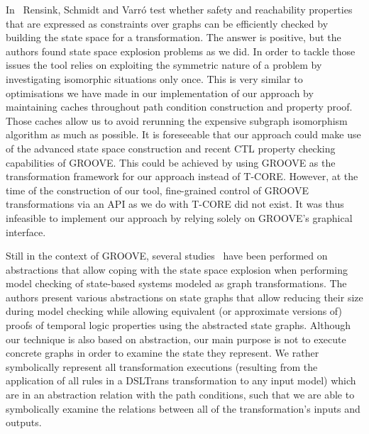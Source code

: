 In~\cite{DBLP:conf/gg/RensinkSV04} Rensink, Schmidt and Varr\'o test whether safety and reachability properties that are expressed as constraints over graphs can be efficiently checked by building the state space for a transformation. The answer is positive, but the authors found state space explosion problems as we did. In order to tackle those issues the tool relies on exploiting the symmetric nature of a problem by investigating isomorphic situations only once. This is very similar to optimisations we have made in our implementation of our approach by maintaining caches throughout path condition construction and property proof. Those caches allow us to avoid rerunning the expensive subgraph isomorphism algorithm as much as possible. It is foreseeable that our approach could make use of the advanced state space construction and recent CTL property checking capabilities of GROOVE. This could be achieved by using GROOVE as the transformation framework for our approach instead of T-CORE. However, at the time of the construction of our tool, fine-grained control of GROOVE transformations via an API as we do with T-CORE did not exist. It was thus infeasible to implement our approach by relying solely on GROOVE's graphical interface.

Still in the context of GROOVE, several studies~\cite{RensinkD06,BauerBKR08,RensinkZ12} have been performed on abstractions that allow coping with the state space explosion when performing model checking of state-based systems modeled as graph transformations. The authors present various abstractions on state graphs that allow reducing their size during model checking while allowing equivalent (or approximate versions of) proofs of temporal logic properties using the abstracted state graphs. Although our technique is also based on abstraction, our main purpose is not to execute concrete graphs in order to examine the state they represent. We rather symbolically represent all transformation executions (resulting from the application of all rules in a DSLTrans transformation to any input model) which are in an abstraction relation with the path conditions, such that we are able to symbolically examine the relations between all of the transformation's inputs and outputs.

